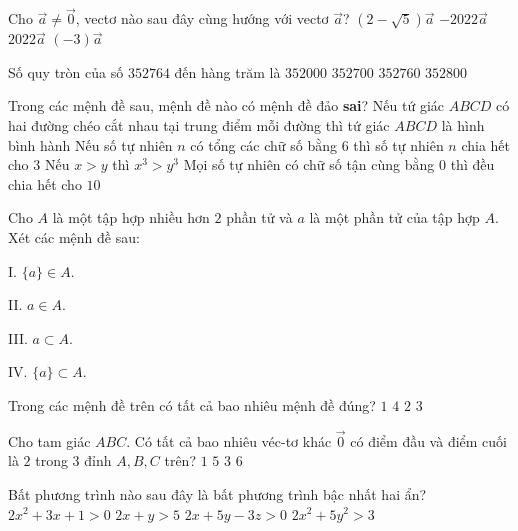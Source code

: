 \begin{ex}%
	Cho $\vec{a} \neq \overrightarrow{0}$, vectơ nào sau đây cùng hướng với vectơ $\vec{a}$?
	\choice
	{$(2-\sqrt{5})\vec{a}$}
	{$-2022 \vec{a}$}
	{\True $2022 \vec{a}$}
	{$(-3) \vec{a}$}
\end{ex}
\begin{ex}%
	Số quy tròn của số $ 352764 $ đến hàng trăm là
	\choice
	{$ 352000 $}
	{$ 352700 $}
	{$ 352760 $}
	{\True $ 352800 $}
\end{ex}
\begin{ex}%
	Trong các mệnh đề sau, mệnh đề nào có mệnh đề đảo \textbf{sai}?
	\choice
	{Nếu tứ giác $ABCD$ có hai đường chéo cắt nhau tại trung điểm mỗi đường thì tứ giác $ABCD$ là hình bình hành}
	{\True Nếu số tự nhiên $n$ có tổng các chữ số bằng $ 6 $ thì số tự nhiên $n$ chia hết cho $ 3 $}
	{ Nếu $x>y$ thì $x^3>y^3$}
	{Mọi số tự nhiên có chữ số tận cùng bằng $ 0 $ thì đều chia hết cho $ 10 $}
\end{ex}
\begin{ex}%
	Cho $A$ là một tập hợp nhiều hơn $2$ phần tử và $a$ là một phần tử của tập hợp $A$. Xét các mệnh đề sau:
	\begin{enumEX}{4}
		\item [I.]$\{a\} \in A$.
		\item [II.] $a \in A$.
		\item [III.] $a \subset A$.
		\item [	IV.] $\{a\} \subset A$.
	\end{enumEX}
	Trong các mệnh đề trên có tất cả bao nhiêu mệnh đề đúng?
	\choice
	{$1$}
	{$4$}
	{\True $2$}
	{$3$}
\end{ex}
\begin{ex}%
	Cho tam giác $ABC$. Có tất cả bao nhiêu véc-tơ khác $\overrightarrow{0}$ có điểm đầu và điểm cuối là $ 2 $ trong $ 3 $ đỉnh $A, B, C$ trên?
	\choice
	{$1$}
	{$5$}
	{$3$}
	{\True $6$}
\end{ex}
\begin{ex}%
	Bất phương trình nào sau đây là bất phương trình bậc nhất hai ẩn?
	\choice
	{$2x^2+3x+1>0$}
	{\True $2x+y>5$}
	{$2x+5y-3z>0$}
	{$2x^2+5y^2>3$}
\end{ex}

